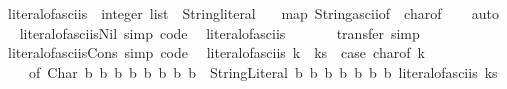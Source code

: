 \begin{isabellebody}
\ literal{\isacharunderscore}{\kern0pt}of{\isacharunderscore}{\kern0pt}asciis\ {\isacharcolon}{\kern0pt}{\isacharcolon}{\kern0pt}\ {\isachardoublequoteopen}integer\ list\ {\isasymRightarrow}\ String{\isachardot}{\kern0pt}literal{\isachardoublequoteclose}\isanewline
\ \ \ {\isachardoublequoteopen}map\ {\isacharparenleft}{\kern0pt}String{\isachardot}{\kern0pt}ascii{\isacharunderscore}{\kern0pt}of\ {\isasymcirc}\ char{\isacharunderscore}{\kern0pt}of{\isacharparenright}{\kern0pt}{\isachardoublequoteclose}\isanewline
%
\isadelimproof
\ \ %
\endisadelimproof
%
\isatagproof
{}\isamarkupfalse%
\ auto\isanewline
\isanewline
{}%
\endisatagproof
{\isafoldproof}%
%
\isadelimproof
%
\endisadelimproof
\ \isamarkupfalse%
\ literal{\isacharunderscore}{\kern0pt}of{\isacharunderscore}{\kern0pt}asciis{\isacharunderscore}{\kern0pt}Nil\ {\isacharbrackleft}{\kern0pt}simp{\isacharcomma}{\kern0pt}\ code{\isacharbrackright}{\kern0pt}{\isacharcolon}{\kern0pt}\isanewline
\ \ {\isachardoublequoteopen}literal{\isacharunderscore}{\kern0pt}of{\isacharunderscore}{\kern0pt}asciis\ {\isacharbrackleft}{\kern0pt}{\isacharbrackright}{\kern0pt}\ {\isacharequal}{\kern0pt}\ {}{\isachardoublequoteclose}\isanewline
%
\isadelimproof
\ \ %
\endisadelimproof
%
\isatagproof
{}\isamarkupfalse%
\ transfer\ simp\isanewline
\isanewline
{}%
\endisatagproof
{\isafoldproof}%
%
\isadelimproof
%
\endisadelimproof
\ \isamarkupfalse%
\ literal{\isacharunderscore}{\kern0pt}of{\isacharunderscore}{\kern0pt}asciis{\isacharunderscore}{\kern0pt}Cons\ {\isacharbrackleft}{\kern0pt}simp{\isacharcomma}{\kern0pt}\ code{\isacharbrackright}{\kern0pt}{\isacharcolon}{\kern0pt}\isanewline
\ \ {\isachardoublequoteopen}literal{\isacharunderscore}{\kern0pt}of{\isacharunderscore}{\kern0pt}asciis\ {\isacharparenleft}{\kern0pt}k\ {\isacharhash}{\kern0pt}\ ks{\isacharparenright}{\kern0pt}\ {\isacharequal}{\kern0pt}\ {\isacharparenleft}{\kern0pt}case\ char{\isacharunderscore}{\kern0pt}of\ k\isanewline
\ \ \ \ of\ Char\ b{}\ b{}\ b{}\ b{}\ b{}\ b{}\ b{}\ b{}\ {\isasymRightarrow}\ String{\isachardot}{\kern0pt}Literal\ b{}\ b{}\ b{}\ b{}\ b{}\ b{}\ b{}\ {\isacharparenleft}{\kern0pt}literal{\isacharunderscore}{\kern0pt}of{\isacharunderscore}{\kern0pt}asciis\ ks{\isacharparenright}{\kern0pt}{\isacharparenright}{\kern0pt}{\isachardoublequoteclose}\isanewline

\end{isabellebody}
